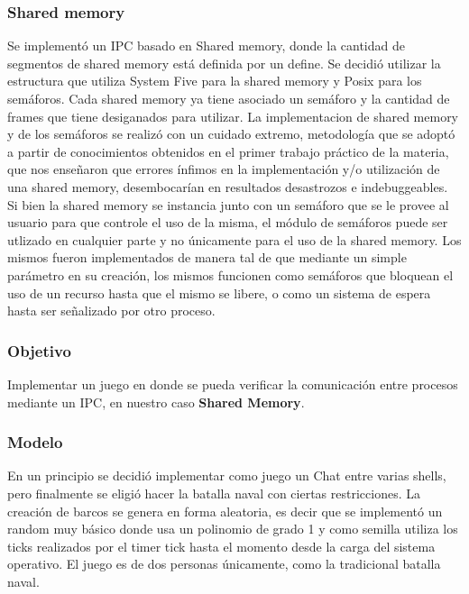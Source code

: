 \documentclass[10pt,a4paper]{article}
\begin{document}
	\subsubsection{Shared memory}
		Se implement\'o un IPC basado en Shared memory, donde la cantidad de segmentos de shared memory est\'a definida por un define. Se decidi\'o utilizar la estructura que utiliza System Five para la shared memory y Posix para los sem\'aforos. Cada shared memory ya tiene asociado un sem\'aforo y la cantidad de frames que tiene desiganados para utilizar. La implementacion de shared memory y de los sem\'aforos se realiz\'o con un cuidado extremo, metodolog\'ia que se adopt\'o a partir de conocimientos obtenidos en el primer trabajo pr\'actico de la materia, que nos ense\~naron que errores \'infimos en la implementaci\'on y/o utilizaci\'on de una shared memory, desembocar\'ian en resultados desastrozos e indebuggeables. Si bien la shared memory se instancia junto con un sem\'aforo que se le provee al usuario para que controle el uso de la misma, el m\'odulo de sem\'aforos puede ser utlizado en cualquier parte y no \'unicamente para el uso de la shared memory. Los mismos fueron implementados de manera tal de que mediante un simple par\'ametro en su creaci\'on, los mismos funcionen como sem\'aforos que bloquean el uso de un recurso hasta que el mismo se libere, o como un sistema de espera hasta ser se\~nalizado por otro proceso.
	\subsubsection{Objetivo}
		Implementar un juego en donde se pueda verificar la comunicaci\'on entre procesos mediante un IPC, en nuestro caso \textbf{Shared Memory}.
	\subsubsection{Modelo}
		En un principio se decidi\'o implementar como juego un Chat entre varias shells, pero finalmente se eligi\'o hacer la batalla naval con ciertas restricciones. La creaci\'on de barcos se genera en forma aleatoria, es decir que se implement\'o un random muy b\'asico donde usa un polinomio de grado 1 y como semilla utiliza los ticks realizados por el timer tick hasta el momento desde la carga del sistema operativo. El juego es de dos personas \'unicamente, como la tradicional batalla naval.
\end{document}
